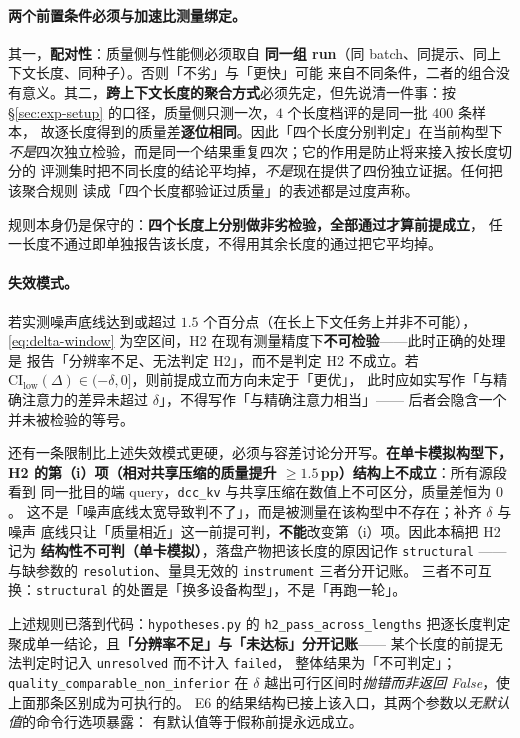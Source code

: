 \paragraph{两个前置条件必须与加速比测量绑定。}其一，\textbf{配对性}：质量侧与性能侧必须取自
\textbf{同一组 run}（同 batch、同提示、同上下文长度、同种子）。否则「不劣」与「更快」可能
来自不同条件，二者的组合没有意义。其二，\textbf{跨上下文长度的聚合方式}必须先定，但先说清一件事：按
\S\ref{sec:exp-setup} 的口径，质量侧只测一次，$4$ 个长度档评的是同一批 $400$ 条样本，
故逐长度得到的质量差\textbf{逐位相同}。因此「四个长度分别判定」在当前构型下
\emph{不是}四次独立检验，而是同一个结果重复四次；它的作用是防止将来接入按长度切分的
评测集时把不同长度的结论平均掉，\emph{不是}现在提供了四份独立证据。任何把该聚合规则
读成「四个长度都验证过质量」的表述都是过度声称。

规则本身仍是保守的：\textbf{四个长度上分别做非劣检验，全部通过才算前提成立}，
任一长度不通过即单独报告该长度，不得用其余长度的通过把它平均掉。

\paragraph{失效模式。}若实测噪声底线达到或超过 $1.5$ 个百分点（在长上下文任务上并非不可能），
\eqref{eq:delta-window} 为空区间，H2 在现有测量精度下\textbf{不可检验}——此时正确的处理是
报告「分辨率不足、无法判定 H2」，而不是判定 H2 不成立。若
$\mathrm{CI}_{\text{low}}(\Delta) \in (-\delta, 0]$，则前提成立而方向未定于「更优」，
此时应如实写作「与精确注意力的差异未超过 $\delta$」，不得写作「与精确注意力相当」——
后者会隐含一个并未被检验的等号。

还有一条限制比上述失效模式更硬，必须与容差讨论分开写。\textbf{在单卡模拟构型下，
H2 的第（i）项（相对共享压缩的质量提升 $\ge 1.5$\,pp）结构上不成立}：所有源段看到
同一批目的端 query，\texttt{dcc\_kv} 与共享压缩在数值上不可区分，质量差恒为 $0$。
这不是「噪声底线太宽导致判不了」，而是被测量在该构型中不存在；补齐 $\delta$ 与噪声
底线只让「质量相近」这一前提可判，\textbf{不能}改变第（i）项。因此本稿把 H2 记为
\textbf{结构性不可判（单卡模拟）}，落盘产物把该长度的原因记作 \texttt{structural}
——与缺参数的 \texttt{resolution}、量具无效的 \texttt{instrument} 三者分开记账。
三者不可互换：\texttt{structural} 的处置是「换多设备构型」，不是「再跑一轮」。

上述规则已落到代码：\texttt{hypotheses.py} 的 \texttt{h2\_pass\_}\allowbreak\texttt{across\_}\allowbreak\texttt{lengths}
把逐长度判定聚成单一结论，且\textbf{「分辨率不足」与「未达标」分开记账}——
某个长度的前提无法判定时记入 \texttt{unresolved} 而不计入 \texttt{failed}，
整体结果为「不可判定」；\texttt{quality\_comparable\_non\_inferior} 在
$\delta$ 越出可行区间时\emph{抛错而非返回 False}，使上面那条区别成为可执行的。
E6 的结果结构已接上该入口，其两个参数以\emph{无默认值}的命令行选项暴露：
有默认值等于假称前提永远成立。

